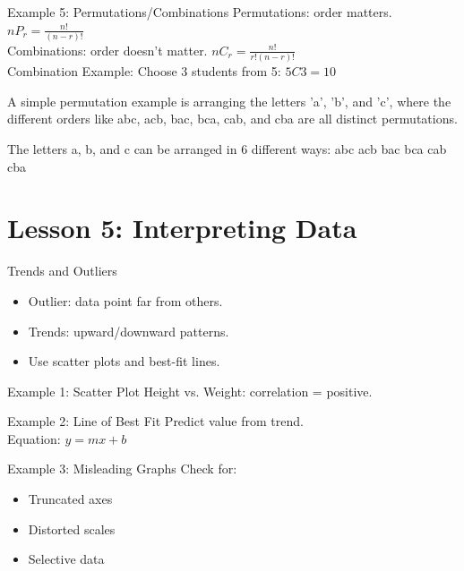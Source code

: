 \documentclass{beamer}
\begin{document}
\begin{frame}{Example 5: Permutations/Combinations}
Permutations: order matters. \(nP_r=\frac{n!}{(n-r)!}\)
\\
\vspace{0.2 cm}
Combinations: order doesn’t matter. \(nC_r=\frac{n!}{r!(n-r)!}\)
\\
\vspace{0.2 cm}
Combination Example: Choose 3 students from 5: \(5C3=10\)\\
\vspace{0.2 cm}

A simple permutation example is arranging the letters 'a', 'b', and 'c', where the different orders like abc, acb, bac, bca, cab, and cba are all distinct permutations. 

The letters a, b, and c can be arranged in 6 different ways: 
abc
acb
bac
bca
cab
cba

\end{frame}


\section{Lesson 5: Interpreting Data}

\begin{frame}{Trends and Outliers}
\begin{itemize}
  \item Outlier: data point far from others.
  \item Trends: upward/downward patterns.
  \item Use scatter plots and best-fit lines.
\end{itemize}
\end{frame}

\begin{frame}{Example 1: Scatter Plot}
Height vs. Weight: correlation = positive.
\\
\end{frame}

\begin{frame}{Example 2: Line of Best Fit}
Predict value from trend.
\\
Equation: \(y = mx + b\)
\end{frame}

\begin{frame}{Example 3: Misleading Graphs}
Check for:
\begin{itemize}
  \item Truncated axes
  \item Distorted scales
  \item Selective data
\end{itemize}
\end{frame}
\end{document}
